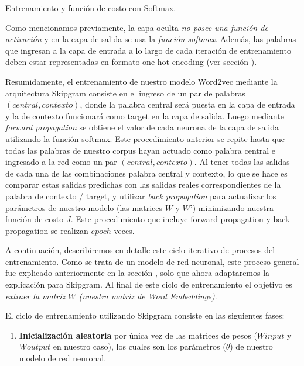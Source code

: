 \documentclass[12pt,a4paper]{article}
\makeatletter
\renewcommand\paragraph{\@startsection{paragraph}{4}{\z@}
            {-2.5ex\@plus -1ex \@minus -.25ex}
            {1.25ex \@plus .25ex}
            {\normalfont\normalsize\bfseries}}
\makeatother
\begin{document}
\begin{sloppypar}
\cleardoublepage

\paragraph{Entrenamiento y función de costo con Softmax.}\label{ent_costo_softmax}

Como mencionamos previamente, la capa oculta \textit{no posee una función de activación} y en la capa de salida se usa la \textit{función softmax}. Además, las palabras que ingresan a la capa de entrada a lo largo de cada iteración de entrenamiento deben estar representadas en formato one hot encoding (ver sección \textit{}).

Resumidamente, el entrenamiento de nuestro modelo Word2vec mediante la arquitectura Skipgram consiste en el ingreso de un par de palabras $(central, contexto)$, donde la palabra central será puesta en la capa de entrada y la de contexto funcionará como target en la capa de salida. Luego mediante \textit{forward propagation} se obtiene el valor de cada neurona de la capa de salida utilizando la función softmax. Este procedimiento anterior se repite hasta que todas las palabras de nuestro corpus hayan actuado como palabra central e ingresado a la red como un par $(central, contexto)$.
Al tener todas las salidas de cada una de las combinaciones palabra central y contexto, lo que se hace es comparar estas salidas predichas con las salidas reales correspondientes de la palabra de contexto / target, y utilizar \textit{back propagation} para actualizar los parámetros de nuestro modelo (las matrices $W$ y $W’$) minimizando nuestra función de costo $J$. Este procedimiento que incluye forward propagation y back propagation se realizan $epoch$ veces. 

A continuación, describiremos en detalle este ciclo iterativo de procesos del entrenamiento. Como se trata de un modelo de red neuronal, este proceso general fue explicado anteriormente en la sección \textit{}, solo que ahora adaptaremos la explicación para Skipgram. Al final de este ciclo de entrenamiento el objetivo es \textit{extraer la matriz $W$ (nuestra matriz de Word Embeddings)}.

El ciclo de entrenamiento utilizando Skipgram consiste en las siguientes fases:
\begin{enumerate}

\item \textbf{Inicialización aleatoria} por única vez de las matrices de pesos ($W input$ y $W output$ en nuestro caso), los cuales son los parámetros ($\theta$) de nuestro modelo de red neuronal.  


\end{enumerate}
\end{sloppypar}
\end{document}
